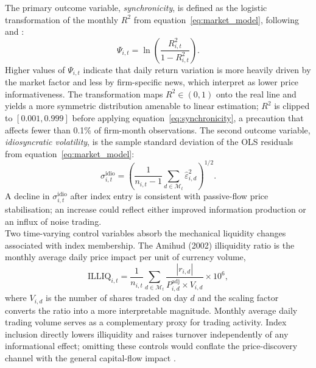 \documentclass[12pt, a4paper]{article}
\begin{document}
The primary outcome variable, \textit{synchronicity}, is defined as the logistic transformation of the monthly $R^2$ from equation~\eqref{eq:market_model}, following \citet{roll1988r2} and \citet{morck2000information}:
\begin{equation}
    \Psi_{i,t} = \ln\!\left(\frac{R^2_{i,t}}{1 - R^2_{i,t}}\right). \label{eq:synchronicity}
\end{equation}
Higher values of $\Psi_{i,t}$ indicate that daily return variation is more heavily driven by the market factor and less by firm-specific news, which \citet{morck2000information} interpret as lower price informativeness. The transformation maps $R^2 \in (0,1)$ onto the real line and yields a more symmetric distribution amenable to linear estimation; $R^2$ is clipped to $[0.001, 0.999]$ before applying equation~\eqref{eq:synchronicity}, a precaution that affects fewer than 0.1\% of firm-month observations. The second outcome variable, \textit{idiosyncratic volatility}, is the sample standard deviation of the OLS residuals from equation~\eqref{eq:market_model}:
\begin{equation}
    \sigma^{\text{idio}}_{i,t} = \left(\frac{1}{n_{i,t}-1}\sum_{d \in \mathcal{M}_t} \hat{\varepsilon}_{i,d}^2\right)^{1/2}. \label{eq:idiovol}
\end{equation}
A decline in $\sigma^{\text{idio}}_{i,t}$ after index entry is consistent with passive-flow price stabilisation; an increase could reflect either improved information production or an influx of noise trading.\\

Two time-varying control variables absorb the mechanical liquidity changes associated with index membership. The Amihud (2002) illiquidity ratio is the monthly average daily price impact per unit of currency volume,
\begin{equation}
    \text{ILLIQ}_{i,t} = \frac{1}{n_{i,t}}\sum_{d \in \mathcal{M}_t}\frac{|r_{i,d}|}{P^{\text{adj}}_{i,d} \times V_{i,d}} \times 10^6, \label{eq:amihud}
\end{equation}
where $V_{i,d}$ is the number of shares traded on day $d$ and the scaling factor converts the ratio into a more interpretable magnitude. Monthly average daily trading volume serves as a complementary proxy for trading activity. Index inclusion directly lowers illiquidity and raises turnover independently of any informational effect; omitting these controls would conflate the price-discovery channel with the general capital-flow impact \citep{chen2004breadth}.\\
\end{document}
